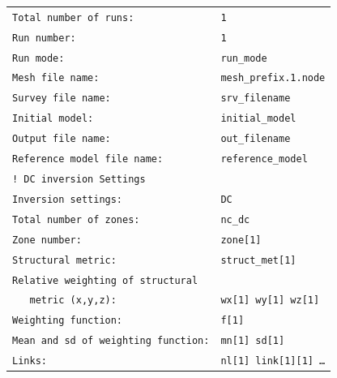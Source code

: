 \documentclass[a4paper,12pt]{article}
\begin{document}
\begin{framed}
\small
\begin{tabular}{@{}p{}@{\hspace{1em}}p{}@{}}
\textcolor{commentcolor}{\texttt{Total number of runs:}} & \textcolor{valuecolor}{\texttt{1}} \\[0.3em]
\textcolor{settingcolor}{\texttt{Run number:}} & \textcolor{valuecolor}{\texttt{1}} \\
\textcolor{settingcolor}{\texttt{Run mode:}} & \textcolor{valuecolor}{\texttt{run\_mode}} \\
\textcolor{settingcolor}{\texttt{Mesh file name:}} & \textcolor{valuecolor}{\texttt{mesh\_prefix.1.node}} \\
\textcolor{settingcolor}{\texttt{Survey file name:}} & \textcolor{valuecolor}{\texttt{srv\_filename}} \\
\textcolor{settingcolor}{\texttt{Initial model:}} & \textcolor{valuecolor}{\texttt{initial\_model}} \\
\textcolor{settingcolor}{\texttt{Output file name:}} & \textcolor{valuecolor}{\texttt{out\_filename}} \\
\textcolor{settingcolor}{\texttt{Reference model file name:}} & \textcolor{valuecolor}{\texttt{reference\_model}} \\[0.3em]
\textcolor{commentcolor}{\texttt{! DC inversion Settings}} & \\
\textcolor{settingcolor}{\texttt{Inversion settings:}} & \textcolor{valuecolor}{\texttt{DC}} \\
\textcolor{settingcolor}{\texttt{Total number of zones:}} & \textcolor{valuecolor}{\texttt{nc\_dc}} \\[0.3em]
\textcolor{settingcolor}{\texttt{Zone number:}} & \textcolor{valuecolor}{\texttt{zone[1]}} \\
\textcolor{settingcolor}{\texttt{Structural metric:}} & \textcolor{valuecolor}{\texttt{struct\_met[1]}} \\
\textcolor{settingcolor}{\texttt{Relative weighting of structural}} & \\
\textcolor{settingcolor}{\texttt{~~ metric (x,y,z):}} & \textcolor{valuecolor}{\texttt{wx[1] wy[1] wz[1]}} \\
\textcolor{settingcolor}{\texttt{Weighting function:}} & \textcolor{valuecolor}{\texttt{f[1]}} \\
\textcolor{settingcolor}{\texttt{Mean and sd of weighting function:}} & \textcolor{valuecolor}{\texttt{mn[1] sd[1]}} \\
\textcolor{settingcolor}{\texttt{Links:}} & \textcolor{valuecolor}{\texttt{nl[1] link[1][1] \ldots}} \\

\end{tabular}
\end{framed}
\end{document}
